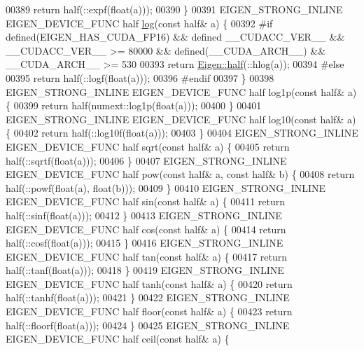 \begin{DoxyCode}
00389   \textcolor{keywordflow}{return} half(::expf(\textcolor{keywordtype}{float}(a)));
00390 \}
00391 EIGEN\_STRONG\_INLINE EIGEN\_DEVICE\_FUNC half \hyperlink{structlog}{log}(\textcolor{keyword}{const} half& a) \{
00392 \textcolor{preprocessor}{#if defined(EIGEN\_HAS\_CUDA\_FP16) && defined \_\_CUDACC\_VER\_\_ && \_\_CUDACC\_VER\_\_ >= 80000 &&
       defined(\_\_CUDA\_ARCH\_\_) && \_\_CUDA\_ARCH\_\_ >= 530}
00393   \textcolor{keywordflow}{return} \hyperlink{struct_eigen_1_1half}{Eigen::half}(::hlog(a));
00394 \textcolor{preprocessor}{#else}
00395   \textcolor{keywordflow}{return} half(::logf(\textcolor{keywordtype}{float}(a)));
00396 \textcolor{preprocessor}{#endif}
00397 \}
00398 EIGEN\_STRONG\_INLINE EIGEN\_DEVICE\_FUNC half log1p(\textcolor{keyword}{const} half& a) \{
00399   \textcolor{keywordflow}{return} half(numext::log1p(\textcolor{keywordtype}{float}(a)));
00400 \}
00401 EIGEN\_STRONG\_INLINE EIGEN\_DEVICE\_FUNC half log10(\textcolor{keyword}{const} half& a) \{
00402   \textcolor{keywordflow}{return} half(::log10f(\textcolor{keywordtype}{float}(a)));
00403 \}
00404 EIGEN\_STRONG\_INLINE EIGEN\_DEVICE\_FUNC half sqrt(\textcolor{keyword}{const} half& a) \{
00405   \textcolor{keywordflow}{return} half(::sqrtf(\textcolor{keywordtype}{float}(a)));
00406 \}
00407 EIGEN\_STRONG\_INLINE EIGEN\_DEVICE\_FUNC half pow(\textcolor{keyword}{const} half& a, \textcolor{keyword}{const} half& b) \{
00408   \textcolor{keywordflow}{return} half(::powf(\textcolor{keywordtype}{float}(a), \textcolor{keywordtype}{float}(b)));
00409 \}
00410 EIGEN\_STRONG\_INLINE EIGEN\_DEVICE\_FUNC half sin(\textcolor{keyword}{const} half& a) \{
00411   \textcolor{keywordflow}{return} half(::sinf(\textcolor{keywordtype}{float}(a)));
00412 \}
00413 EIGEN\_STRONG\_INLINE EIGEN\_DEVICE\_FUNC half cos(\textcolor{keyword}{const} half& a) \{
00414   \textcolor{keywordflow}{return} half(::cosf(\textcolor{keywordtype}{float}(a)));
00415 \}
00416 EIGEN\_STRONG\_INLINE EIGEN\_DEVICE\_FUNC half tan(\textcolor{keyword}{const} half& a) \{
00417   \textcolor{keywordflow}{return} half(::tanf(\textcolor{keywordtype}{float}(a)));
00418 \}
00419 EIGEN\_STRONG\_INLINE EIGEN\_DEVICE\_FUNC half tanh(\textcolor{keyword}{const} half& a) \{
00420   \textcolor{keywordflow}{return} half(::tanhf(\textcolor{keywordtype}{float}(a)));
00421 \}
00422 EIGEN\_STRONG\_INLINE EIGEN\_DEVICE\_FUNC half floor(\textcolor{keyword}{const} half& a) \{
00423   \textcolor{keywordflow}{return} half(::floorf(\textcolor{keywordtype}{float}(a)));
00424 \}
00425 EIGEN\_STRONG\_INLINE EIGEN\_DEVICE\_FUNC half ceil(\textcolor{keyword}{const} half& a) \{

\end{DoxyCode}
